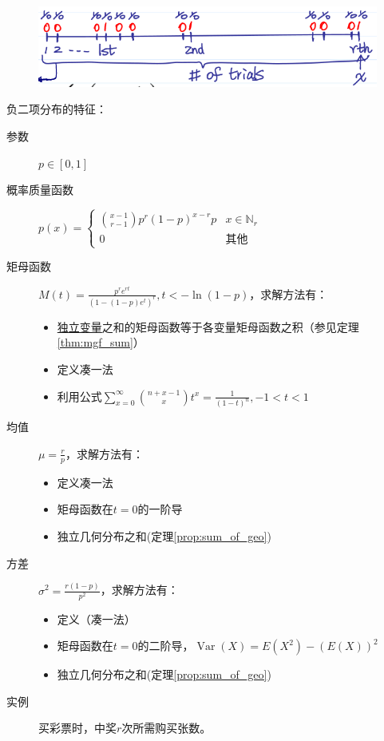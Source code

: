 \begin{figure}[h]
    \centering
    \includegraphics{image/NB_dist_intu.png}
\end{figure}

负二项分布的特征：
\begin{description}
    \item[参数] $p \in [0,1]$
    \item[概率质量函数] $p(x)=\begin{cases}
                \binom{x-1}{r-1}p^r (1-p)^{x-r} p & x \in \mathbb{N}_r \\
                0                                 & \text{其他}
            \end{cases}$
    \item[矩母函数] $M(t)=\frac{p^r e^{rt}}{(1-(1-p)e^t)^r}, t<-\ln (1-p)$，求解方法有：
        \begin{itemize}
            \item \underline{独立变量}之和的矩母函数等于各变量矩母函数之积（参见定理\ref{thm:mgf_sum}）
            \item 定义凑一法
            \item 利用公式$\sum_{x=0}^{\infty}\binom{n+x-1}{x}t^x=\frac{1}{(1-t)^n},-1<t<1$
        \end{itemize}
    \item[均值] $\mu=\frac{r}{p}$，求解方法有：
        \begin{itemize}
            \item 定义凑一法
            \item 矩母函数在$t=0$的一阶导
            \item 独立几何分布之和(定理\ref{prop:sum_of_geo})
        \end{itemize}
    \item[方差] $\sigma^2=\frac{r(1-p)}{p^2}$，求解方法有：
        \begin{itemize}
            \item 定义（凑一法）
            \item 矩母函数在$t=0$的二阶导，$\operatorname{Var}(X)=E(X^2)-(E(X))^2$
            \item 独立几何分布之和(定理\ref{prop:sum_of_geo})
        \end{itemize}
    \item[实例] 买彩票时，中奖$r$次所需购买张数。
\end{description}

